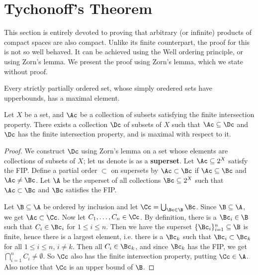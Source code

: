 
\section{Tychonoff's Theorem}

This section is entirely devoted to proving that arbitrary  (or infinite) products of compact spaces
are also compact. Unlike its finite counterpart, the proof for this is not so well behaved. It can
be achieved using the Well ordering principle, or using Zorn's lemma. We present the proof using
Zorn's lemma, which we state without proof.

\begin{lemma}\label{3.5.1}
    Every strictly partially ordered set, whose simply oredered sets have upperbounds, has a maximal
    element.
\end{lemma}

\begin{lemma}\label{3.5.2}
    Let $X$ be a set, and  $\Ac$ be a collection of subsets satisfying the finite intersection
    property. There exists a collection  $\Dc$ of subsets of  $X$ such that  $\Ac \subseteq \Dc$ and
    $\Dc$ has the finite intersection property, and is maximal with respect to it.
\end{lemma}
\begin{proof}
    We construct $\Dc$ using Zorn's lemma on a set whose elements are collections of subsets of
    $X$; let us denote is as a  \textbf{superset}. Let $\Ac \subseteq 2^X$ satisfy the FIP. Define a
    partial order $\subset$ on supersets by  $\Ac \subset \Bc$ if  $\Ac \subseteq \Bc$ and  $\Ac
    \neq \Bc$. Let  $\A$ be the superset of all collections  $\Bc \subseteq 2^X$ such that  $\Ac
    \subset \Bc$ and  $\Bc$ satisfies the FIP.

    Let  $\B \subseteq \A$ be ordered by inclusion and let  $\Cc=\bigcup_{\Bc \in \B}{\Bc}$. Since
    $\B \subseteq \A$, we get  $\Ac \subset \Cc$. Now let $C_1, \dots, C_n \in \Cc$. By definition,
    there is a $\Bc_i \in \B$ such that  $C_i \in \Bc_i$ for  $1 \leq i \leq n$. Then we have the
    superset  $\{\Bc_i\}_{i=1}^n \subseteq \B$ is finite, hence there is a largest element, i.e.
    there is a $\Bc_k$ such that  $\Bc_i \subset \Bc_k$ for all  $1 \leq i \leq n$,  $i \neq k$.
    Then all  $C_i \in \Bc_k$, and since  $\Bc_k$ has the FIP, we get  $\bigcap_{i=1}^n{C_i} \neq
    \emptyset$. So $\Cc$ also has the finite intersection property, putting  $\Cc \in \A$. Also
    notice that  $\Cc$ is an upper bound of  $\B$.
\end{proof}

